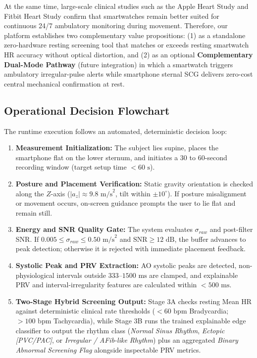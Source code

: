 At the same time, large-scale clinical studies such as the Apple Heart Study \cite{perez2019large} and Fitbit Heart Study \cite{lubitz2022detection} confirm that smartwatches remain better suited for continuous 24/7 ambulatory monitoring during movement. Therefore, our platform establishes two complementary value propositions: (1) as a standalone zero-hardware resting screening tool that matches or exceeds resting smartwatch HR accuracy without optical distortion, and (2) as an optional \textbf{Complementary Dual-Mode Pathway} (future integration) in which a smartwatch triggers ambulatory irregular-pulse alerts while smartphone sternal SCG delivers zero-cost central mechanical confirmation at rest.

\subsection{Operational Decision Flowchart}
The runtime execution follows an automated, deterministic decision loop:
\begin{enumerate}
	\item \textbf{Measurement Initialization:} The subject lies supine, places the smartphone flat on the lower sternum, and initiates a 30 to 60-second recording window (target setup time $< 60\text{ s}$).
	\item \textbf{Posture and Placement Verification:} Static gravity orientation is checked along the $Z$-axis ($|a_z| \approx 9.8\text{ m/s}^2$, tilt within $\pm 10^\circ$). If posture misalignment or movement occurs, on-screen guidance prompts the user to lie flat and remain still.
	\item \textbf{Energy and SNR Quality Gate:} The system evaluates $\sigma_{raw}$ and post-filter SNR. If $0.005 \le \sigma_{raw} \le 0.50\text{ m/s}^2$ and $\text{SNR} \ge 12\text{ dB}$, the buffer advances to peak detection; otherwise it is rejected with immediate placement feedback.
	\item \textbf{Systolic Peak and PRV Extraction:} AO systolic peaks are detected, non-physiological intervals outside $333\text{--}1500\text{ ms}$ are clamped, and explainable PRV and interval-irregularity features are calculated within $< 500\text{ ms}$.
	\item \textbf{Two-Stage Hybrid Screening Output:} Stage 3A checks resting Mean HR against deterministic clinical rate thresholds ($< 60\text{ bpm}$ Bradycardia; $> 100\text{ bpm}$ Tachycardia), while Stage 3B runs the trained explainable edge classifier to output the rhythm class (\textit{Normal Sinus Rhythm}, \textit{Ectopic [PVC/PAC]}, or \textit{Irregular / AFib-like Rhythm}) plus an aggregated \textit{Binary Abnormal Screening Flag} alongside inspectable PRV metrics.
\end{enumerate}


